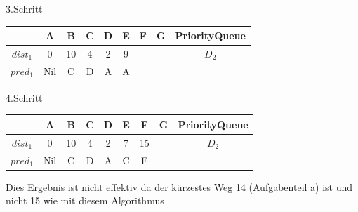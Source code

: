 \documentclass[11pt]{article}
\begin{document}
\begin{enumerate}[a)]
3.Schritt

\begin{tabular}{|c|c|c|c|c|c|c|c|c|}
	\hline  		  & A & B & C & D & E & F & G & PriorityQueue\\ 
	\hline $dist_{1}$ & 0 & 10  & 4 & 2 & 9 &  &  & $D_{2}$\\ 
	\hline $pred_{1}$ & Nil & C & D & A & A &  &  &\\
	\hline 
\end{tabular}  

4.Schritt

\begin{tabular}{|c|c|c|c|c|c|c|c|c|}
	\hline  		  & A & B & C & D & E & F & G & PriorityQueue\\ 
	\hline $dist_{1}$ & 0 & 10  & 4 & 2 & 7 & 15 &  & $D_{2}$\\ 
	\hline $pred_{1}$ & Nil & C & D & A & C & E &  &\\
	\hline 
\end{tabular}

Dies Ergebnis ist nicht effektiv da der kürzestes Weg 14 (Aufgabenteil a) ist und nicht 15 wie mit diesem Algorithmus


\end{enumerate} 
  
\end{document}
